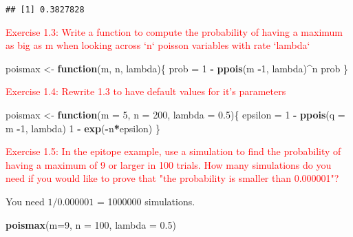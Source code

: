 \documentclass[]{article}
\newenvironment{Shaded}{\begin{snugshade}}{\end{snugshade}}
\newcommand{\KeywordTok}[1]{\textcolor[rgb]{0.13,0.29,0.53}{\textbf{#1}}}
\newcommand{\DataTypeTok}[1]{\textcolor[rgb]{0.13,0.29,0.53}{#1}}
\newcommand{\DecValTok}[1]{\textcolor[rgb]{0.00,0.00,0.81}{#1}}
\newcommand{\FloatTok}[1]{\textcolor[rgb]{0.00,0.00,0.81}{#1}}
\newcommand{\StringTok}[1]{\textcolor[rgb]{0.31,0.60,0.02}{#1}}
\newcommand{\ControlFlowTok}[1]{\textcolor[rgb]{0.13,0.29,0.53}{\textbf{#1}}}
\newcommand{\OperatorTok}[1]{\textcolor[rgb]{0.81,0.36,0.00}{\textbf{#1}}}
\newcommand{\NormalTok}[1]{#1}
\begin{document}
\begin{verbatim}
## [1] 0.3827828
\end{verbatim}

\textcolor{red}{Exercise 1.3: Write a function to compute the probability of having a maximum as big as m when looking across `n` poisson variables with rate `lambda`}

\begin{Shaded}
\begin{Highlighting}[]
\NormalTok{poismax <-}\StringTok{ }\ControlFlowTok{function}\NormalTok{(m, n, lambda)\{}
\NormalTok{  prob =}\StringTok{ }\DecValTok{1} \OperatorTok{-}\StringTok{ }\KeywordTok{ppois}\NormalTok{(m }\OperatorTok{-}\DecValTok{1}\NormalTok{, lambda)}\OperatorTok{^}\NormalTok{n}
\NormalTok{  prob}
\NormalTok{\}}
\end{Highlighting}
\end{Shaded}

\textcolor{red}{Exercise 1.4: Rewrite 1.3 to have default values for it's parameters}

\begin{Shaded}
\begin{Highlighting}[]
\NormalTok{poismax <-}\StringTok{ }\ControlFlowTok{function}\NormalTok{(}\DataTypeTok{m =} \DecValTok{5}\NormalTok{, }\DataTypeTok{n =} \DecValTok{200}\NormalTok{, }\DataTypeTok{lambda =} \FloatTok{0.5}\NormalTok{)\{}
\NormalTok{  epsilon =}\StringTok{ }\DecValTok{1} \OperatorTok{-}\StringTok{ }\KeywordTok{ppois}\NormalTok{(}\DataTypeTok{q =}\NormalTok{ m }\OperatorTok{-}\DecValTok{1}\NormalTok{, lambda)}
  \DecValTok{1} \OperatorTok{-}\StringTok{ }\KeywordTok{exp}\NormalTok{(}\OperatorTok{-}\NormalTok{n}\OperatorTok{*}\NormalTok{epsilon)}
\NormalTok{\}}
\end{Highlighting}
\end{Shaded}

\textcolor{red}{Exercise 1.5: In the epitope example, use a simulation to find the probability of having a maximum of 9 or larger in 100 trials. How many simulations do you need if you would like to prove that "the probability is smaller than 0.000001"?}

You need \(1/0.000001\) = 1000000 simulations.

\begin{Shaded}
\begin{Highlighting}[]
\KeywordTok{poismax}\NormalTok{(}\DataTypeTok{m=}\DecValTok{9}\NormalTok{, }\DataTypeTok{n =} \DecValTok{100}\NormalTok{, }\DataTypeTok{lambda =} \FloatTok{0.5}\NormalTok{)}
\end{Highlighting}
\end{Shaded}
\end{document}
